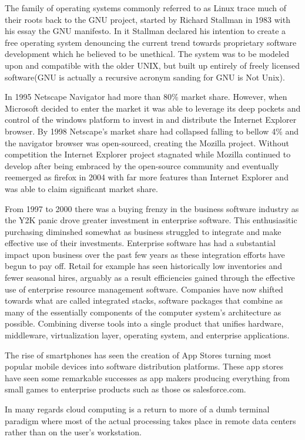 The family of operating systems commonly referred to as Linux trace much of their roots back to the GNU project, started by Richard Stallman in 1983 with his essay the GNU manifesto.\autocite[]{GNUManifesto}
In it Stallman declared his intention to create a free operating system denouncing the current trend towards proprietary software development which he believed to be unethical.\autocite[]{GNUManifesto}
The system was to be modeled upon and compatible with the older UNIX, but built up entirely of freely licensed software(GNU is actually a recursive acronym sanding for GNU is Not Unix).\autocite[]{GNUManifesto}

In 1995 Netscape Navigator had more than 80\% market share. However, when Microsoft decided to enter the market it was able to leverage its deep pockets and control of the windows platform to invest in and distribute the Internet Explorer browser. By 1998 Netscape's market share had collapsed falling to bellow 4\% and the navigator browser was open-sourced, creating the Mozilla project. Without competition the Internet Explorer project stagnated while Mozilla continued to develop after being embraced by the open-source community and eventually reemerged as firefox in 2004 with far more features than Internet Explorer and was able to claim significant market share.\autocite[27]{buxmann2012software}

From 1997 to 2000 there was a buying frenzy in the business software industry as the Y2K panic drove greater investment in enterprise software.\autocite[]{AftermathOfIntegratedStack}
This enthusiasitic purchasing diminshed somewhat as business struggled to integrate and make effective use of their investments.\autocite[]{AftermathOfIntegratedStack}
Enterprise software has had a substantial impact upon business over the past few years as these integration efforts have begun to pay off. Retail for example has seen historically low inventories and fewer seasonal hires, arguably as a result efficiencies gained through the effective use of enterprise resource management software. \autocite[]{AftermathOfIntegratedStack}
Companies have now shifted towards what are called integrated stacks, software packages that combine as many of the essentially components of the computer system's architecture as possible. Combining diverse tools into a single product that unifies hardware, middleware, virtualization layer, operating system, and enterprise applications.\autocite[]{AftermathOfIntegratedStack}

The rise of smartphones has seen the creation of App Stores turning most popular mobile devices into software distribution platforms.\autocite[]{TheAppEconomy}
These app stores have seen some remarkable successes as app makers producing everything from small games to enterprise products such as those os salesforce.com.\autocite[45]{TheAppEconomy}




In many regards cloud computing is a return to more of a dumb terminal paradigm where most of the actual processing takes place in remote data centers rather than on the user's workstation.\autocite[]{LargeParadigmShiftCloudComputing}
